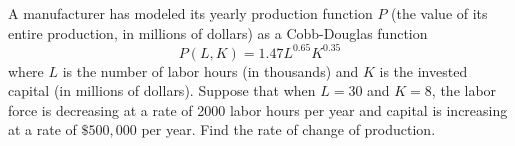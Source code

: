 \documentclass[12pt]{amsart}
\begin{document}
\newpage

\begin{problem}[20 points]
    A manufacturer has modeled its yearly production function $P$ (the value of its entire production, in millions of dollars) as a Cobb-Douglas function
$$
P(L, K)=1.47 L^{0.65} K^{0.35}
$$
where $L$ is the number of labor hours (in thousands) and $K$ is the invested capital (in millions of dollars). Suppose that when $L=30$ and $K=8$, the labor force is decreasing at a rate of 2000 labor hours per year and capital is increasing at a rate of $\$ 500,000$ per year. Find the rate of change of production.
\end{problem}

\printbibliography 
%
%
\end{document}
